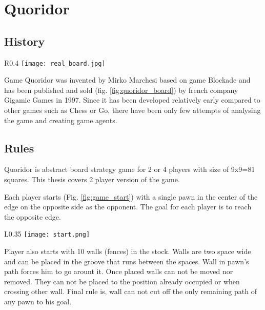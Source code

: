 \chapter{Quoridor}\label{chap:3}

\section{History}
\begin{wrapfigure}{R}{0.4\textwidth}
  \vspace*{-1.80cm}
  \centering
  \texttt{[image: real\_board.jpg]}
  \vspace*{-0.20cm}
  \caption{real board}
  \label{fig:quoridor_board}
  \vspace*{-1.40cm}
\end{wrapfigure}

Game Quoridor was invented by Mirko Marchesi based on game Blockade and
has been published and sold (fig. \ref{fig:quoridor_board}) by french company
Gigamic Games in 1997. Since it has been developed relatively early compared
to other games such as Chess or Go, there have been only few attempts
of analysing the game and creating game agents.

\section{Rules}
Quoridor is abstract board strategy game for 2 or 4 players with size of
9x9=81 squares. This thesis covers 2 player version of the game.

Each player starts (Fig. \ref{fig:game_start}) with a single pawn in the center
of the edge on the opposite side as the opponent.
The goal for each player is to reach the opposite edge.

\begin{wrapfigure}{L}{0.35\textwidth}
  \vspace*{-0.60cm}
  \centering
  \texttt{[image: start.png]}
  \vspace*{-0.80cm}
  \caption{game start}
  \label{fig:game_start}
  \vspace*{-0.80cm}
\end{wrapfigure}

Player also starts with 10 walls (fences) in the stock.
Walls are two space wide and can be placed in the groove that runs between
the spaces.
Wall in pawn's path forces him to go arount it.
Once placed walls can not be moved nor removed.
They can not be placed to the position already occupied or when crossing
other wall.
Final rule is, wall can not cut off the only remaining path of any pawn
to his goal.

